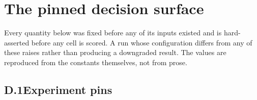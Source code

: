 %
\section{The pinned decision surface}
\label{app:repro}

Every quantity below was fixed before any of its inputs existed and is hard-asserted before any
cell is scored. A run whose configuration differs from any of these raises rather than producing a
downgraded result. The values are reproduced from the constants themselves, not from prose.

\subsection*{D.1\quad Experiment pins}

